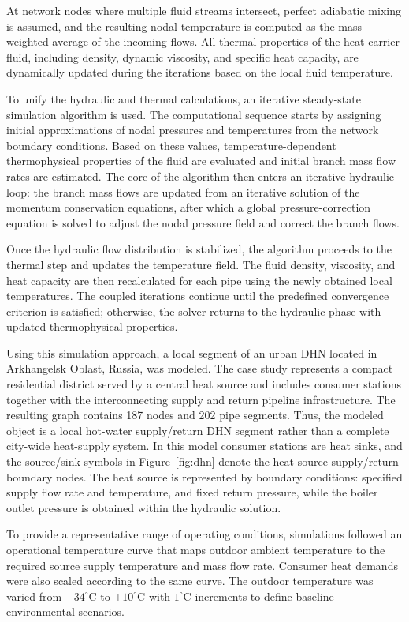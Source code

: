 \documentclass[energies,article,submit,pdftex,moreauthors]{Definitions/mdpi}
\newif\ifshowrevisions
\newcommand{\revisionstyle}[1]{\textcolor{blue}{#1}}
\newcommand{\revision}[1]{\ifshowrevisions\revisionstyle{#1}\else#1\fi}
\begin{document}
At network nodes where multiple fluid streams intersect, perfect adiabatic
mixing is assumed, and the resulting nodal temperature is computed as the
mass-weighted average of the incoming flows. All thermal properties of the heat
carrier fluid, including density, dynamic viscosity, and specific heat
capacity, are dynamically updated during the iterations based on the local
fluid temperature.

To unify the hydraulic and thermal calculations, an iterative steady-state
simulation algorithm is used. The computational sequence starts by assigning
initial approximations of nodal pressures and temperatures from the network
boundary conditions. Based on these values, temperature-dependent
thermophysical properties of the fluid are evaluated and initial branch mass
flow rates are estimated. The core of the algorithm then enters an iterative
hydraulic loop: the branch mass flows are updated from an iterative solution of
the momentum conservation equations, after which a global pressure-correction
equation is solved to adjust the nodal pressure field and correct the branch
flows.

Once the hydraulic flow distribution is stabilized, the algorithm proceeds to
the thermal step and updates the temperature field. The fluid density,
viscosity, and heat capacity are then recalculated for each pipe using the
newly obtained local temperatures. The coupled iterations continue until the
predefined convergence criterion is satisfied; otherwise, the solver returns to
the hydraulic phase with updated thermophysical properties.

Using this simulation approach, a local segment of an urban DHN located in
Arkhangelsk Oblast, Russia, was modeled. The case study represents a compact
residential district served by a central heat source and includes consumer
stations together with the interconnecting supply and return pipeline
infrastructure. The resulting graph contains 187 nodes and 202 pipe segments.
Thus, the modeled object is a local hot-water supply/return
DHN segment rather than a complete city-wide heat-supply system. In this model consumer
stations are heat sinks, and the source/sink symbols in Figure~\ref{fig:dhn}
denote the heat-source supply/return boundary nodes.
The heat source is represented by boundary conditions: specified supply flow
rate and temperature, and fixed return pressure, while the boiler outlet
pressure is obtained within the hydraulic solution.

To provide a representative range of operating conditions, simulations followed
an operational temperature curve that maps outdoor ambient temperature to the
required source supply temperature and mass flow rate. Consumer heat demands
were also scaled according to the same curve. The outdoor temperature was
varied from $-34^{\circ}\mathrm{C}$ to $+10^{\circ}\mathrm{C}$ with
$1^{\circ}\mathrm{C}$ increments to define baseline environmental scenarios.
\end{document}
